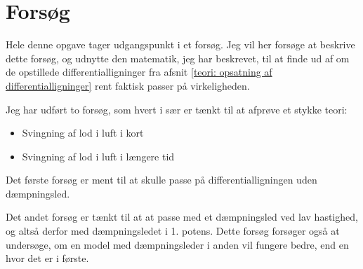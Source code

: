 \chapter{Forsøg}
Hele denne opgave tager udgangspunkt i et forsøg.
Jeg vil her forsøge at beskrive dette forsøg, og udnytte den matematik, jeg har beskrevet, til at finde ud af om de opstillede differentialligninger fra afsnit \ref{teori: opsatning af differentialligninger} rent faktisk passer på virkeligheden.

Jeg har udført to forsøg, som hvert i sær er tænkt til at afprøve et stykke teori:
\begin{itemize}
	\item Svingning af lod i luft i kort
	\item Svingning af lod i luft i længere tid
\end{itemize}

Det første forsøg er ment til at skulle passe på differentialligningen uden dæmpningsled.

Det andet forsøg er tænkt til at at passe med et dæmpningsled ved lav hastighed, og altså derfor med dæmpningsledet i 1. potens.
Dette forsøg forsøger også at undersøge, om en model med dæmpningsleder i anden vil fungere bedre, end en hvor det er i første. 
